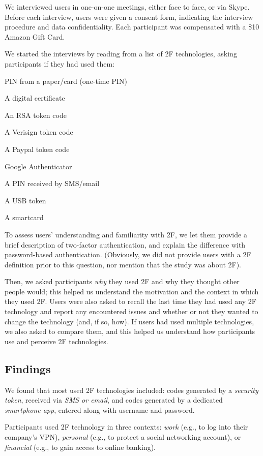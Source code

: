 \documentclass[conference]{IEEEtran}
\begin{document}
We interviewed users in one-on-one meetings, either face to face, or via Skype. Before each interview, users were given a consent form, indicating the interview procedure and data confidentiality. Each participant was compensated with a \$10 Amazon Gift Card.

We started the interviews by reading from a list of 2F technologies, asking participants if they had used them: 
\begin{compactitem}
\item PIN from a paper/card (one-time PIN)
\item A digital certificate
\item An RSA token code
\item A Verisign token code
\item A Paypal token code
\item Google Authenticator
\item A PIN received by SMS/email
\item A USB token
\item A smartcard
\end{compactitem}

To assess users' understanding and familiarity with 2F, we let them provide a brief 
description of two-factor authentication, and explain the difference with password-based authentication. (Obviously, we did not provide users with a 2F definition prior to this question, nor mention that the study was about 2F).

Then, we asked participants {\em why} they used 2F and why they thought other people would; this helped us understand the motivation and the context in which they used 2F.
Users were also asked to recall the last time they had used any 2F technology and report any encountered issues and whether or not they wanted to change the technology (and, if so, how). If users had used multiple technologies, we also asked to compare them, and this helped us understand how participants use and perceive 2F technologies.


\subsection{Findings}
We found that most used 2F technologies included: codes generated by a \emph{security token}, received via \emph{SMS or email}, and codes generated by a dedicated \emph{smartphone app}, entered along with username and password.


Participants used 2F technology in three contexts: \emph{work} (e.g., to log into their company's VPN), \emph{personal} (e.g., to protect a social networking account), or \emph{financial} (e.g., to gain access to online banking).
\end{document}
